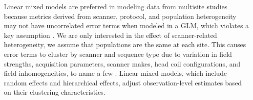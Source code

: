 Linear mixed models are preferred in modeling data from multisite studies because metrics derived from scanner, protocol, and population heterogeneity may not have uncorrelated error terms when modeled in a GLM, which violates a key assumption \cite{garson2013fundamentals}. We are only interested in the effect of scanner-related heterogeneity, we assume that populations are the same at each site. This causes error terms to cluster by scanner and sequence type due to variation in field strengths, acquisition parameters, scanner makes, head coil configurations, and field inhomogeneities, to name a few \cite{cannon2014}. Linear mixed models, which include random effects and hierarchical effects, adjust observation-level estimates based on their clustering characteristics\cite{garson2013fundamentals}.